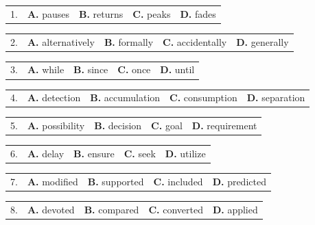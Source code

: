 \documentclass[UTF8,11pt]{ctexart}
\begin{document}
\noindent\begin{tabularx}{\linewidth}{@{}lXXXX@{}}1. & \textbf{A.} pauses & \textbf{B.} returns & \textbf{C.} peaks & \textbf{D.} fades\\\end{tabularx}\par

\noindent\begin{tabularx}{\linewidth}{@{}lXXXX@{}}2. & \textbf{A.} alternatively & \textbf{B.} formally & \textbf{C.} accidentally & \textbf{D.} generally\\\end{tabularx}\par

\noindent\begin{tabularx}{\linewidth}{@{}lXXXX@{}}3. & \textbf{A.} while & \textbf{B.} since & \textbf{C.} once & \textbf{D.} until\\\end{tabularx}\par

\noindent\begin{tabularx}{\linewidth}{@{}lXXXX@{}}4. & \textbf{A.} detection & \textbf{B.} accumulation & \textbf{C.} consumption & \textbf{D.} separation\\\end{tabularx}\par

\noindent\begin{tabularx}{\linewidth}{@{}lXXXX@{}}5. & \textbf{A.} possibility & \textbf{B.} decision & \textbf{C.} goal & \textbf{D.} requirement\\\end{tabularx}\par

\noindent\begin{tabularx}{\linewidth}{@{}lXXXX@{}}6. & \textbf{A.} delay & \textbf{B.} ensure & \textbf{C.} seek & \textbf{D.} utilize\\\end{tabularx}\par

\noindent\begin{tabularx}{\linewidth}{@{}lXXXX@{}}7. & \textbf{A.} modified & \textbf{B.} supported & \textbf{C.} included & \textbf{D.} predicted\\\end{tabularx}\par

\noindent\begin{tabularx}{\linewidth}{@{}lXXXX@{}}8. & \textbf{A.} devoted & \textbf{B.} compared & \textbf{C.} converted & \textbf{D.} applied\\\end{tabularx}\par
\end{document}
